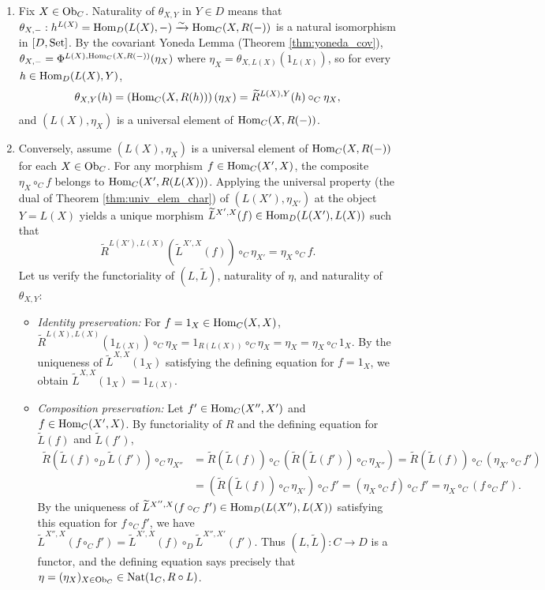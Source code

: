 \documentclass[10pt,a4paper]{article}
\begin{document}
\begin{enumerate}
\item Fix $X \in {\textrm{Ob}}_C$. Naturality of $\theta_{X,Y}$ in $Y \in D$ means that $\theta_{X,-} : h^{L(X)} = {\textrm{Hom}}_D(L(X), -) \xrightarrow{\sim} {\textrm{Hom}}_C(X, R(-))$ is a natural isomorphism in $[D, {\textrm{Set}}]$. By the covariant Yoneda Lemma (Theorem \ref{thm:yoneda_cov}), $\theta_{X,-} = \Phi^{L(X), {\textrm{Hom}}_C(X,R(-))}(\eta_X)$ where $\eta_X = \theta_{X,L(X)}(1_{L(X)})$, so for every $h \in {\textrm{Hom}}_D(L(X), Y)$,
$$\theta_{X,Y}(h) = \left({\textrm{Hom}}_C(X, R(h))\right)(\eta_X) = \widetilde{R}^{L(X),Y}(h) \circ_C \eta_X,$$
and $(L(X), \eta_X)$ is a universal element of ${\textrm{Hom}}_C(X, R(-))$.
\item Conversely, assume $(L(X), \eta_X)$ is a universal element of ${\textrm{Hom}}_C(X, R(-))$ for each $X \in {\textrm{Ob}}_C$. For any morphism $f \in {\textrm{Hom}}_C(X', X)$, the composite $\eta_X \circ_C f$ belongs to ${\textrm{Hom}}_C(X', R(L(X)))$. Applying the universal property (the dual of Theorem \ref{thm:univ_elem_char}) of $(L(X'), \eta_{X'})$ at the object $Y = L(X)$ yields a unique morphism $\widetilde{L}^{X',X}(f) \in {\textrm{Hom}}_D(L(X'), L(X))$ such that
$$\widetilde{R}^{L(X'),L(X)}\left(\widetilde{L}^{X',X}(f)\right) \circ_C \eta_{X'} = \eta_X \circ_C f.$$
Let us verify the functoriality of $(L, \widetilde{L})$, naturality of $\eta$, and naturality of $\theta_{X,Y}$:
\begin{itemize}
\item \emph{Identity preservation:} For $f = 1_X \in {\textrm{Hom}}_C(X, X)$, $\widetilde{R}^{L(X),L(X)}(1_{L(X)}) \circ_C \eta_X = 1_{R(L(X))} \circ_C \eta_X = \eta_X = \eta_X \circ_C 1_X$. By the uniqueness of $\widetilde{L}^{X,X}(1_X)$ satisfying the defining equation for $f = 1_X$, we obtain $\widetilde{L}^{X,X}(1_X) = 1_{L(X)}$.
\item \emph{Composition preservation:} Let $f' \in {\textrm{Hom}}_C(X'', X')$ and $f \in {\textrm{Hom}}_C(X', X)$. By functoriality of $R$ and the defining equation for $\widetilde{L}(f)$ and $\widetilde{L}(f')$,
\begin{align*}
\widetilde{R}\left(\widetilde{L}(f) \circ_D \widetilde{L}(f')\right) \circ_C \eta_{X''} &= \widetilde{R}(\widetilde{L}(f)) \circ_C \left(\widetilde{R}(\widetilde{L}(f')) \circ_C \eta_{X''}\right) = \widetilde{R}(\widetilde{L}(f)) \circ_C \left(\eta_{X'} \circ_C f'\right) \\
&= \left(\widetilde{R}(\widetilde{L}(f)) \circ_C \eta_{X'}\right) \circ_C f' = \left(\eta_X \circ_C f\right) \circ_C f' = \eta_X \circ_C (f \circ_C f').
\end{align*}
By the uniqueness of $\widetilde{L}^{X'',X}(f \circ_C f') \in {\textrm{Hom}}_D(L(X''), L(X))$ satisfying this equation for $f \circ_C f'$, we have $\widetilde{L}^{X'',X}(f \circ_C f') = \widetilde{L}^{X',X}(f) \circ_D \widetilde{L}^{X'',X'}(f')$. Thus $(L, \widetilde{L}) : C \to D$ is a functor, and the defining equation says precisely that $\eta = (\eta_X)_{X \in {\textrm{Ob}}_C} \in {\textrm{Nat}}(1_C, R \circ L)$.

\end{itemize}
\end{enumerate}
\end{document}
